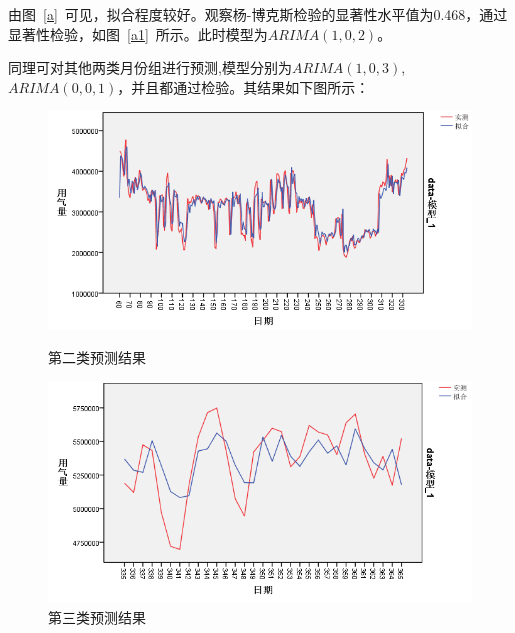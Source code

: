 \documentclass{whutmod}
\begin{document}
	由图~\ref{a}~可见，拟合程度较好。观察杨-博克斯检验的显著性水平值为0.468，通过显著性检验，如图~\ref{a1}~所示。此时模型为$ARIMA(1,0,2)$。%
	
	同理可对其他两类月份组进行预测,模型分别为$ARIMA(1,0,3)$,$ARIMA(0,0,1)$，并且都通过检验。其结果如下图所示：
	
	\begin{figure}[H]
		\begin{minipage}[t]{0.45\linewidth}
			\centering
			\includegraphics[width=\textwidth]{figures/b.png}
			\caption{第二类预测结果}
		\end{minipage}%
		\begin{minipage}[t]{0.45\linewidth}
			\centering
			\includegraphics[width=\textwidth]{figures/c.png}
			\caption{第三类预测结果}
		\end{minipage}
	\end{figure}
	
\end{document}
